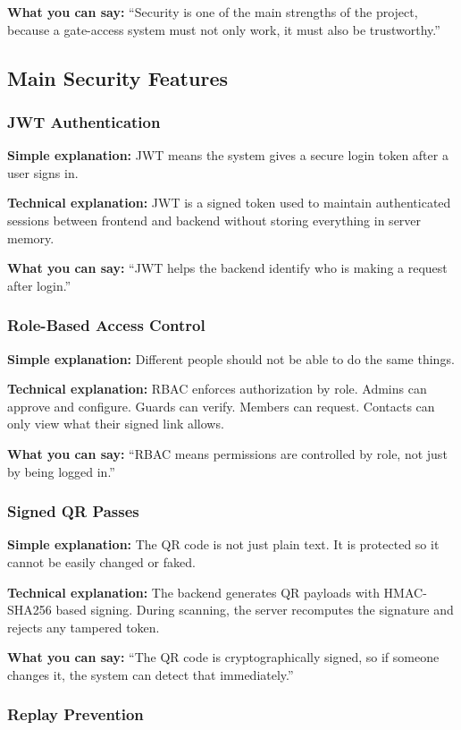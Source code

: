 \documentclass[12pt,letterpaper]{article}
\newcommand{\simple}[1]{\textbf{Simple explanation:} #1}
\newcommand{\technical}[1]{\textbf{Technical explanation:} #1}
\newcommand{\say}[1]{\textbf{What you can say:} ``#1''}
\begin{document}
\say{Security is one of the main strengths of the project, because a gate-access system must not only work, it must also be trustworthy.}

\subsection{Main Security Features}

\subsubsection{JWT Authentication}

\simple{JWT means the system gives a secure login token after a user signs in.}

\technical{JWT is a signed token used to maintain authenticated sessions between frontend and backend without storing everything in server memory.}

\say{JWT helps the backend identify who is making a request after login.}

\subsubsection{Role-Based Access Control}

\simple{Different people should not be able to do the same things.}

\technical{RBAC enforces authorization by role. Admins can approve and configure. Guards can verify. Members can request. Contacts can only view what their signed link allows.}

\say{RBAC means permissions are controlled by role, not just by being logged in.}

\subsubsection{Signed QR Passes}

\simple{The QR code is not just plain text. It is protected so it cannot be easily changed or faked.}

\technical{The backend generates QR payloads with HMAC-SHA256 based signing. During scanning, the server recomputes the signature and rejects any tampered token.}

\say{The QR code is cryptographically signed, so if someone changes it, the system can detect that immediately.}

\subsubsection{Replay Prevention}
\end{document}
